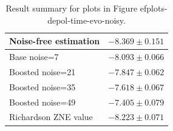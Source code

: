 \begin{table}
\caption{Result summary for plots in Figure 
ef{plots-depol-time-evo-noisy}.}
\begin{tabular*}{\textwidth}{@{\extracolsep{\fill}}ll@{}}
\toprule

Noise-free estimation & $-8.369 \pm 0.151$ \\
\midrule
Base noise=7 & $-8.093 \pm 0.066$ \\
Boosted noise=21 & $-7.847 \pm 0.062$ \\
Boosted noise=35 & $-7.618 \pm 0.067$ \\
Boosted noise=49 & $-7.405 \pm 0.079$ \\
\midrule
Richardson ZNE value & $-8.223 \pm 0.071$ \\
\bottomrule
\end{tabular*}
\label{table-dephasing-time-evo-noisy}
\end{table}
